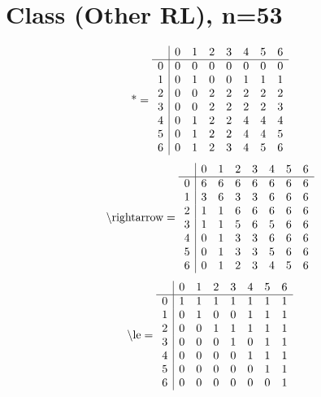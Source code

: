 \documentclass[11pt]{article}
\begin{document}
\section{Class (Other RL), n=53}
\[\text{*} = 
\begin{array}{r | r r r r r r r}
 & 0 & 1 & 2 & 3 & 4 & 5 & 6 \\ \hline
0 & 0 & 0 & 0 & 0 & 0 & 0 & 0 \\
1 & 0 & 1 & 0 & 0 & 1 & 1 & 1 \\
2 & 0 & 0 & 2 & 2 & 2 & 2 & 2 \\
3 & 0 & 0 & 2 & 2 & 2 & 2 & 3 \\
4 & 0 & 1 & 2 & 2 & 4 & 4 & 4 \\
5 & 0 & 1 & 2 & 2 & 4 & 4 & 5 \\
6 & 0 & 1 & 2 & 3 & 4 & 5 & 6 \\
\end{array}
\]
\[\text{\textbackslash rightarrow} = 
\begin{array}{r | r r r r r r r}
 & 0 & 1 & 2 & 3 & 4 & 5 & 6 \\ \hline
0 & 6 & 6 & 6 & 6 & 6 & 6 & 6 \\
1 & 3 & 6 & 3 & 3 & 6 & 6 & 6 \\
2 & 1 & 1 & 6 & 6 & 6 & 6 & 6 \\
3 & 1 & 1 & 5 & 6 & 5 & 6 & 6 \\
4 & 0 & 1 & 3 & 3 & 6 & 6 & 6 \\
5 & 0 & 1 & 3 & 3 & 5 & 6 & 6 \\
6 & 0 & 1 & 2 & 3 & 4 & 5 & 6 \\
\end{array}
\]
\[\text{\textbackslash le} = 
\begin{array}{r | r r r r r r r}
 & 0 & 1 & 2 & 3 & 4 & 5 & 6 \\ \hline
0 & 1 & 1 & 1 & 1 & 1 & 1 & 1 \\
1 & 0 & 1 & 0 & 0 & 1 & 1 & 1 \\
2 & 0 & 0 & 1 & 1 & 1 & 1 & 1 \\
3 & 0 & 0 & 0 & 1 & 0 & 1 & 1 \\
4 & 0 & 0 & 0 & 0 & 1 & 1 & 1 \\
5 & 0 & 0 & 0 & 0 & 0 & 1 & 1 \\
6 & 0 & 0 & 0 & 0 & 0 & 0 & 1 \\
\end{array}
\]
\end{document}
